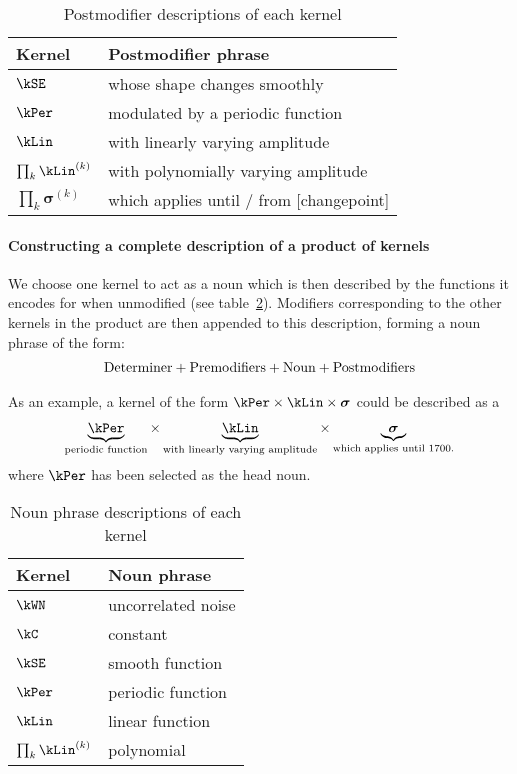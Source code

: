 \begin{table}[ht]
\centering
\begin{tabular}{l|l}
Kernel & Postmodifier phrase \\
\midrule
$\kSE$  & whose shape changes smoothly \\
$\kPer$ & modulated by a periodic function \\
$\kLin$ & with linearly varying amplitude \\
$\prod_k \kLin^{(k)}$ & with polynomially varying amplitude \\
$\prod_k \boldsymbol{\sigma}^{(k)}$ & which applies until / from [changepoint] \\
\end{tabular}
\caption{
Postmodifier descriptions of each kernel
}
\label{table:modifiers}
\end{table}

\paragraph{Constructing a complete description of a product of kernels}
We choose one kernel to act as a noun which is then described by the functions it encodes for when unmodified (see table~\ref{table:nouns}).
Modifiers corresponding to the other kernels in the product are then appended to this description, forming a noun phrase of the form:
\begin{align*}
\textnormal{Determiner}	+	\textnormal{Premodifiers} +	\textnormal{Noun}	+	\textnormal{Postmodifiers}
\end{align*}

As an example, a kernel of the form $\kPer \times  \kLin \times \boldsymbol{\sigma}$ could be described as a
\begin{align*}
\underbrace{\kPer}_{\textnormal{\scriptsize periodic function}} \times 
\underbrace{\kLin}_{\textnormal{\scriptsize with linearly varying amplitude}} \times 
\underbrace{\boldsymbol{\sigma}}_{\textnormal{\scriptsize which applies until 1700.}}
\end{align*}
where $\kPer$ has been selected as the head noun.

\begin{table}[ht]
\centering
\begin{tabular}{l|l}
Kernel & Noun phrase \\
\midrule
$\kWN$  & uncorrelated noise \\
$\kC$   & constant \\
$\kSE$  & smooth function \\
$\kPer$ & periodic function \\
$\kLin$ & linear function \\
$\prod_k \kLin^{(k)}$ & polynomial \\
\end{tabular}
\caption{
Noun phrase descriptions of each kernel
}
\label{table:nouns}
\end{table}

